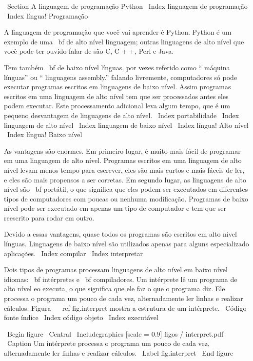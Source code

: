 \documentclass[10pt]{book}
\begin{document}
\ Section {A linguagem de programação Python}
\ Index {linguagem de programação}
\ Index {língua! Programação}

A linguagem de programação que você vai aprender é Python. Python é
um exemplo de uma {\ bf de alto nível linguagem}; outras linguagens de alto nível
que você pode ter ouvido falar de são C, C + +, Perl e Java.

Tem
também {\ bf de baixo nível línguas}, por vezes referido como `` máquina
línguas'' ou `` linguagens assembly.'' falando livremente, computadores
só pode executar programas escritos em linguagens de baixo nível. Assim
programas escritos em uma linguagem de alto nível tem que ser processados ​​antes
eles podem executar. Este processamento adicional leva algum tempo, que é um pequeno
desvantagem de linguagens de alto nível.
\ Index {} portabilidade
\ Index {linguagem de alto nível}
\ Index {linguagem de baixo nível}
\ Index {língua! Alto nível}
\ Index {língua! Baixo nível}

As vantagens são enormes. Em primeiro lugar, é muito mais fácil de programar
em uma linguagem de alto nível. Programas escritos em uma linguagem de alto nível
levam menos tempo para escrever, eles são mais curtos e mais fáceis de ler, e eles
são mais propensos a ser corretas. Em segundo lugar, as linguagens de alto nível são {\ bf
portátil}, o que significa que eles podem ser executados em diferentes tipos de computadores
com poucas ou nenhuma modificação. Programas de baixo nível pode ser executado em apenas um
tipo de computador e tem que ser reescrito para rodar em outro.

Devido a essas vantagens, quase todos os programas são escritos em alto nível
línguas. Linguagens de baixo nível são utilizados apenas para alguns especializado
aplicações.
\ Index {} compilar
\ Index {interpretar}

Dois tipos de programas processam linguagens de alto nível em baixo nível
idiomas: {\ bf intérpretes} e {\ bf compiladores}. Um intérprete
lê um programa de alto nível eo executa, o que significa que ele faz o que
o programa diz. Ele processa o programa um pouco de cada vez,
alternadamente ler linhas e realizar cálculos.
Figura ~ \ ref {fig.interpret} mostra a estrutura de um intérprete.
\ {Código fonte} índice
\ Index {código objeto}
\ Index {executável}

\ Begin {figure}
\ Central
{\ Includegraphics [scale = 0.9] {figos / interpret.pdf}}
\ Caption {Um intérprete processa o programa um pouco de cada vez,
alternadamente ler linhas e realizar cálculos.}
\ Label {} fig.interpret
\ End {figure}
\end{document}

